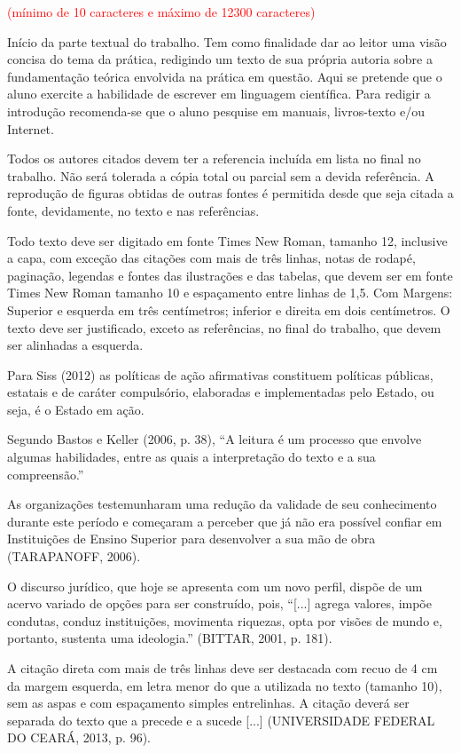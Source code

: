 \textcolor{red}{(mínimo de 10 caracteres e máximo de 12300 caracteres)}

Início da parte textual do trabalho. Tem como finalidade dar ao leitor uma visão concisa do tema da prática, redigindo um texto de sua própria autoria sobre a fundamentação teórica envolvida na prática em questão. Aqui se pretende que o aluno exercite a habilidade de escrever em linguagem científica. Para redigir a introdução recomenda-se que o aluno pesquise em manuais, livros-texto e/ou Internet.

Todos os autores citados devem ter a referencia incluída em lista no final no trabalho. Não será tolerada a cópia total ou parcial sem a devida referência. A reprodução de figuras obtidas de outras fontes é permitida desde que seja citada a fonte, devidamente, no texto e nas referências.

Todo texto deve ser digitado em fonte Times New Roman, tamanho 12, inclusive a capa, com exceção das citações com mais de três linhas, notas de rodapé, paginação, legendas e fontes das ilustrações e das tabelas, que devem ser em fonte Times New Roman tamanho 10 e espaçamento entre linhas de 1,5. Com Margens: Superior e esquerda em três centímetros; inferior e direita em dois centímetros. O texto deve ser justificado, exceto as referências, no final do trabalho, que devem ser alinhadas a esquerda.


\jump

Para Siss (2012) as políticas de ação afirmativas constituem políticas públicas, estatais e de caráter compulsório, elaboradas e implementadas pelo Estado, ou seja, é o Estado em ação.

Segundo Bastos e Keller (2006, p. 38), “A leitura é um processo que envolve algumas habilidades, entre as quais a interpretação do texto e a sua compreensão.”

As organizações testemunharam uma redução da validade de seu conhecimento durante este período e começaram a perceber que já não era possível confiar em Instituições de Ensino Superior para desenvolver a sua mão de obra (TARAPANOFF, 2006).

O discurso jurídico, que hoje se apresenta com um novo perfil, dispõe de um acervo variado de opções para ser construído, pois, “[...] agrega valores, impõe condutas, conduz instituições, movimenta riquezas, opta por visões de mundo e, portanto, sustenta uma ideologia.” (BITTAR, 2001, p. 181).

\begin{leftquote}[]
A citação direta com mais de três linhas deve ser destacada com recuo de 4 cm da margem esquerda, em letra menor do que a utilizada no texto (tamanho 10), sem as aspas e com espaçamento simples entrelinhas. A citação deverá ser separada do texto que a precede e a sucede [...] (UNIVERSIDADE FEDERAL DO CEARÁ, 2013, p. 96).
\end{leftquote}

